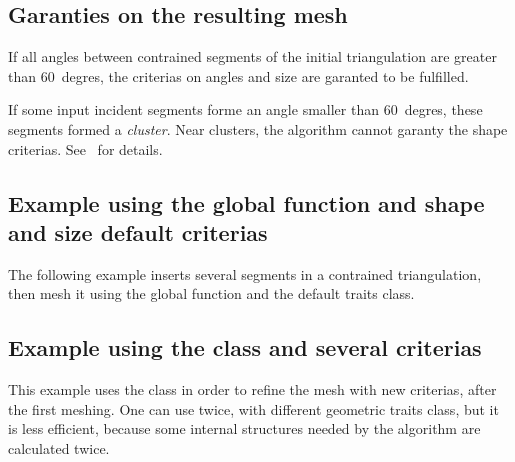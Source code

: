 \subsection{Garanties on the resulting mesh}

If all angles between contrained segments of the initial triangulation are
greater than $60$~degres, the criterias on angles and size are garanted to
be fulfilled.

If some input incident segments forme an angle smaller than $60$~degres,
these segments formed a \textit{cluster}. Near clusters, the algorithm
cannot garanty the shape criterias. See~\cite{s-mgdsa-00} for details.

\subsection{Example using the global function and shape and size default
  criterias}

The following example inserts several segments in a contrained
triangulation, then mesh it using the global function
 and the default traits class.


\subsection{Example using the class  and several
  criterias}

This example uses the class  in order to refine
the mesh with new criterias, after the first meshing. One can use
 twice, with different geometric traits class,
but it is less efficient, because some internal structures needed by the
algorithm are calculated twice.


